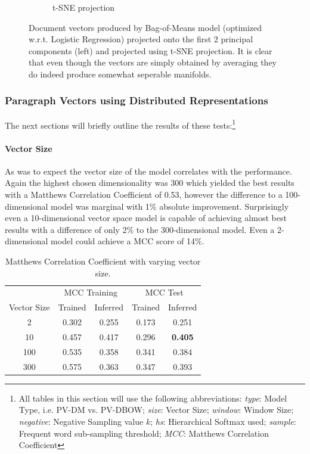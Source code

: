 \begin{figure}[h]
\begin{subfigure}[b]{0.48\textwidth}
      \caption{t-SNE projection}
\label{fig:bom-tsne}
    \end{subfigure}
    \caption{Document vectors produced by Bag-of-Means model (optimized w.r.t. Logistic Regression) projected onto the first 2 principal components (left) and projected using t-SNE projection. It is clear that even though the vectors are simply obtained by averaging they do indeed produce somewhat seperable manifolds.}
\label{fig:bom}
\end{figure}

\subsubsection{Paragraph Vectors using Distributed Representations}


The next sections will briefly outline the results of these tests:\footnote{All tables in this section will use the following abbreviations: \emph{type}: Model Type, i.e. PV-DM vs. PV-DBOW; \emph{size}: Vector Size; \emph{window}: Window Size; \emph{negative}: Negative Sampling value $k$; \emph{hs}: Hierarchical Softmax used; \emph{sample}: Frequent word sub-sampling threshold; \emph{MCC}: Matthews Correlation Coefficient}

\paragraph{Vector Size}
As was to expect the vector size of the model correlates with the performance. Again the highest chosen dimensionality was 300 which yielded the best results with a Matthews Correlation Coefficient of 0.53, however the difference to a 100-dimensional model was marginal with 1\% absolute improvement. Surprisingly even a 10-dimensional vector space model is capable of achieving almost best results with a difference of only 2\% to the 300-dimensional model. Even a 2-dimensional model could achieve a MCC score of 14\%.

\begin{table}[h]
  \begin{center}
    \begin{tabular}{ c | *2c | *2c }
      \toprule
       & \multicolumn{2}{c|}{MCC Training} & \multicolumn{2}{|c}{MCC Test}\\
      Vector Size & Trained & Inferred & Trained & Inferred \\
      \midrule
      2   & 0.302 & 0.255 & 0.173 & 0.251 \\
      10  & 0.457 & 0.417 & 0.296 & \textbf{0.405} \\
      100 & 0.535 & 0.358 & 0.341 & 0.384 \\
      300 & 0.575 & 0.363 & 0.347 & 0.393 \\
      \bottomrule
    \end{tabular}
  \caption{Matthews Correlation Coefficient with varying vector size.}
\label{tab:Paragraph Vector Parameter Results Size}
\end{center}
\end{table}

